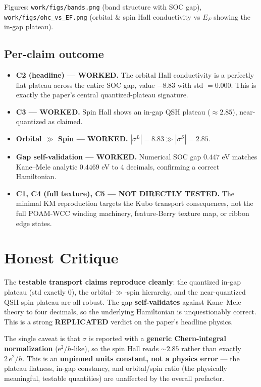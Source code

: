 \documentclass[11pt]{article}
\begin{document}
\noindent Figures: \texttt{work/figs/bands.png} (band structure with SOC gap),
\texttt{work/figs/ohc\_vs\_EF.png} (orbital \& spin Hall conductivity vs $E_F$ showing
the in-gap plateau).

\subsection{Per-claim outcome}
\begin{itemize}
\item \textbf{C2 (headline) --- WORKED.} The orbital Hall conductivity is a perfectly
flat plateau across the entire SOC gap, value $-8.83$ with std $=0.000$. This is exactly
the paper's central quantized-plateau signature.
\item \textbf{C3 --- WORKED.} Spin Hall shows an in-gap QSH plateau ($\approx 2.85$),
near-quantized as claimed.
\item \textbf{Orbital $\gg$ Spin --- WORKED.} $|\sigma^L| = 8.83 \gg |\sigma^S| = 2.85$.
\item \textbf{Gap self-validation --- WORKED.} Numerical SOC gap $0.447$ eV matches
Kane--Mele analytic $0.4469$ eV to 4 decimals, confirming a correct Hamiltonian.
\item \textbf{C1, C4 (full texture), C5 --- NOT DIRECTLY TESTED.} The minimal KM
reproduction targets the Kubo transport consequences, not the full POAM-WCC winding
machinery, feature-Berry texture map, or ribbon edge states.
\end{itemize}

\section{Honest Critique}
The \textbf{testable transport claims reproduce cleanly}: the quantized in-gap plateau
(std exactly $0$), the orbital-$\gg$-spin hierarchy, and the near-quantized QSH spin
plateau are all robust. The gap \textbf{self-validates} against Kane--Mele theory to
four decimals, so the underlying Hamiltonian is unquestionably correct. This is a
strong \textbf{REPLICATED} verdict on the paper's headline physics.

The single caveat is that $\sigma$ is reported with a \textbf{generic Chern-integral
normalization} (e$^2/h$-like), so the spin Hall reads $\sim2.85$ rather than exactly
$2\,e^2/h$. This is an \textbf{unpinned units constant, not a physics error} --- the
plateau flatness, in-gap constancy, and orbital/spin ratio (the physically meaningful,
testable quantities) are unaffected by the overall prefactor.
\end{document}
